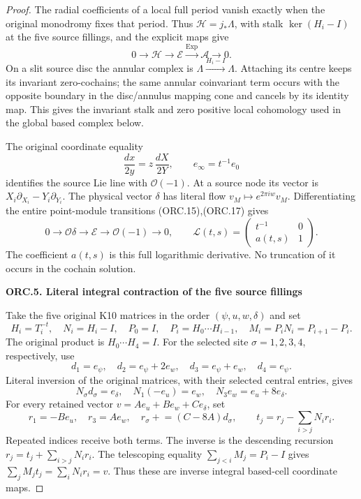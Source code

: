 \begin{proof}
The radial coefficients of a local full period vanish exactly
when the original monodromy fixes that period. Thus
\(\mathscr H=j_*\Lambda\), with stalk \(\ker(H_i-I)\) at the
five source fillings, and the explicit maps give
\[
0\longrightarrow\mathscr H\longrightarrow\mathscr E
 \xrightarrow{\operatorname{Exp}}\mathscr A\longrightarrow0.
\tag{ORC.19}
\]
On a slit source disc the annular complex is
\(\Lambda\xrightarrow{H_i-I}\Lambda\). Attaching its centre
keeps its invariant zero-cochains; the same annular
coinvariant term occurs with the opposite boundary in the
disc/annulus mapping cone and cancels by its identity map.
This gives the invariant stalk and zero positive local
cohomology used in the global based complex below.

The original coordinate equality
\[
\frac{dx}{2y}=z\,\frac{dX}{2Y},\qquad
e_\infty=t^{-1}e_0
\tag{ORC.20}
\]
identifies the source Lie line with \(\mathcal O(-1)\).
At a source node its vector is
\(X_i\partial_{X_i}-Y_i\partial_{Y_i}\).
The physical vector \(\delta\) has literal flow
\(v_M\mapsto e^{2\pi iw}v_M\). Differentiating the entire
point-module transitions (ORC.15),(ORC.17) gives
\[
0\longrightarrow\mathcal O\delta\longrightarrow\mathscr E
 \longrightarrow\mathcal O(-1)\longrightarrow0,\qquad
\mathcal L(t,s)=
\begin{pmatrix}t^{-1}&0\\ a(t,s)&1\end{pmatrix}.
\tag{ORC.21}
\]
The coefficient \(a(t,s)\) is this full logarithmic derivative.
No truncation of it occurs in the cochain solution.

\par

\medskip\noindent\textbf{ORC.5. Literal integral contraction of the five source fillings}

\par\nobreak

Take the five original K10 matrices in the order
\((\psi,u,w,\delta)\) and set
\[
H_i=T_i^{-t},\quad N_i=H_i-I,\quad
P_0=I,\quad P_i=H_0\cdots H_{i-1},\quad
M_i=P_iN_i=P_{i+1}-P_i.
\tag{ORC.22}
\]
The original product is \(H_0\cdots H_4=I\).
For the selected site \(\sigma=1,2,3,4\), respectively, use
\[
d_1=e_\psi,\quad d_2=e_\psi+2e_w,\quad
d_3=e_\psi+e_w,\quad d_4=e_\psi .
\tag{ORC.23}
\]
Literal inversion of the original matrices, with their selected
central entries, gives
\[
N_\sigma d_\sigma=e_\delta,\quad
N_1(-e_u)=e_w,\quad
N_3e_w=e_u+8e_\delta.
\tag{ORC.24}
\]
For every retained vector \(v=Ae_u+Be_w+Ce_\delta\), set
\[
r_1=-Be_u,\quad r_3=Ae_w,\quad
r_\sigma\mathrel{+}=(C-8A)d_\sigma,\qquad
t_j=r_j-\sum_{i>j}N_ir_i.
\tag{ORC.25}
\]
Repeated indices receive both terms. The inverse is the
descending recursion \(r_j=t_j+\sum_{i>j}N_ir_i\).
The telescoping equality \(\sum_{j<i}M_j=P_i-I\) gives
\(\sum_jM_jt_j=\sum_iN_ir_i=v\).
Thus these are inverse integral based-cell coordinate maps.


\end{proof}
